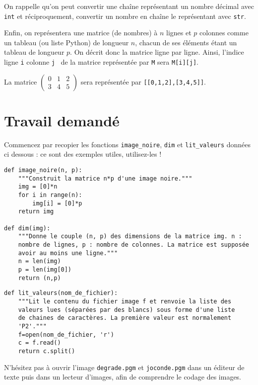 \bigskip On rappelle qu'on peut convertir une chaîne représentant un nombre
décimal avec \texttt{int} et réciproquement, convertir un nombre en chaîne
le représentant avec \texttt{str}.

\bigskip Enfin, on représentera une matrice (de nombres) à $n$ lignes et $p$ colonnes comme un tableau (ou liste Python) de longueur $n$, chacun de ses éléments étant un tableau de longueur $p$. On décrit donc la matrice ligne par ligne. 
Ainsi, l'indice \og ligne \texttt{i} colonne \texttt{j} \fg\ de la matrice représentée par \texttt{M} sera \texttt{M[i][j]}.
\begin{exemple}
	La matrice $\begin{pmatrix} 0&1&2 \\ 3&4&5 \end{pmatrix}$ sera représentée par \texttt{[[0,1,2],[3,4,5]]}.
\end{exemple}


\section*{Travail demandé}

Commencez par recopier les fonctions  \texttt{image\_noire}, \texttt{dim} et  \texttt{lit\_valeurs} données ci dessous : ce sont des exemples utiles, utilisez-les ! 

\begin{lstlisting}
def image_noire(n, p):
    """Construit la matrice n*p d'une image noire."""
    img = [0]*n
    for i in range(n):
        img[i] = [0]*p
    return img
	
def dim(img):
    """Donne le couple (n, p) des dimensions de la matrice img. n :
    nombre de lignes, p : nombre de colonnes. La matrice est supposée
    avoir au moins une ligne."""
    n = len(img)
    p = len(img[0])
    return (n,p)
\end{lstlisting}

\begin{lstlisting}
def lit_valeurs(nom_de_fichier):
    """Lit le contenu du fichier image f et renvoie la liste des
    valeurs lues (séparées par des blancs) sous forme d'une liste
    de chaines de caractères. La première valeur est normalement
    'P2'."""
    f=open(nom_de_fichier, 'r')
    c = f.read()
    return c.split()
\end{lstlisting}



N'hésitez pas à ouvrir l'image \texttt{degrade.pgm} et \texttt{joconde.pgm} dans un éditeur de texte puis dans un lecteur d'images, afin de comprendre le codage des images.


